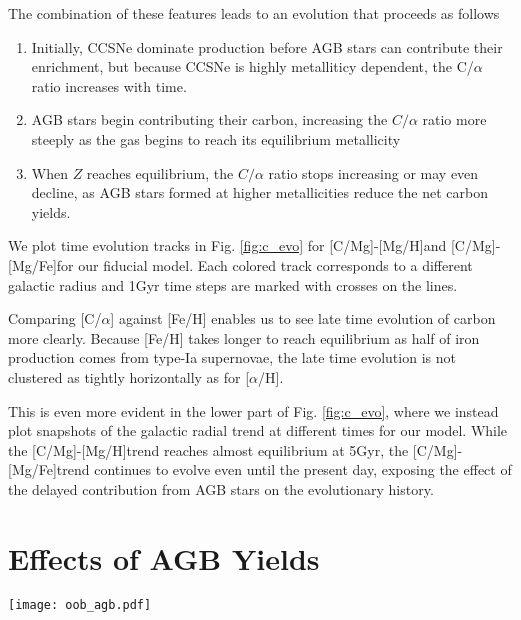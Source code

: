 \documentclass[12pt,oneside]{book}
\newcommand{\cristallo}{\citetalias{cristallo+11}+\citetalias{cristallo+15}}
\newcommand{\karakas}{\citetalias{karakas10}}
\newcommand{\kl}{\citetalias{KL16}+\citetalias{karakas+18}}
\newcommand{\ventura}{\citetalias{ventura+13}}
\newcommand{\caah}{[C/Mg]-[Mg/H]}
\newcommand{\caafe}{[C/Mg]-[Mg/Fe]}
\begin{document}
The combination of these features leads to an evolution that proceeds as follows
\begin{enumerate}
    \item Initially, CCSNe dominate production before AGB stars can contribute their enrichment, but because CCSNe is highly metalliticy dependent, the C/$\alpha$ ratio increases with time.
    \item AGB stars begin contributing their carbon, increasing the $C/\alpha$ ratio more steeply as the gas begins to reach its equilibrium metallicity
    \item When $Z$ reaches equilibrium, the $C/\alpha$ ratio stops increasing or may even decline, as AGB stars formed at higher metallicities reduce the net carbon yields.
\end{enumerate}

We plot time evolution tracks in Fig. \ref{fig:c_evo} for \caah and \caafe for our fiducial model. Each colored track corresponds to a different galactic radius and 1Gyr time steps are marked with crosses on the lines. 

Comparing [C/$\alpha$] against [Fe/H] enables us to see late time evolution of carbon more clearly. Because [Fe/H] takes longer to reach equilibrium as half of iron production comes from type-Ia supernovae, the late time evolution is not clustered as tightly horizontally as for [$\alpha$/H].

This is even more evident in the lower part of Fig. \ref{fig:c_evo}, where we
instead plot snapshots of the galactic radial trend at different times for our
model. While the \caah trend reaches almost equilibrium at 5Gyr, the \caafe trend continues to evolve even until the present day, exposing the effect of the delayed contribution from AGB stars on the evolutionary history.




\section{Effects of AGB Yields}

\begin{figure*}
\texttt{[image: oob\_agb.pdf]}

\caption{Left: the \caah~ \textbf{median} present-day stellar tracks for four different
AGB models (\cristallo, \karakas, \kl, and \ventura ). The median bin [C/Mg] values from \citet{jack_subgiant} are
plotted as black points with 1-std errors marked by horizontal grey dashes.
Right: same as left but for \caafe. While each AGB yield model may
differ in detail, there is minimal effect on the overall [C/Mg] trends. }
\label{fig:agb_sims}
\end{figure*}
\end{document}
